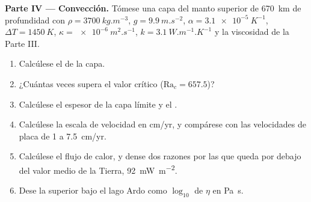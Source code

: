 \begin{problem}
\medskip\noindent\textbf{Parte IV --- Convección.} Tómese una capa del manto superior
de \qty{670}{km} de profundidad con $\rho = \qty{3700}{kg.m^{-3}}$, $g =
\qty{9.9}{m.s^{-2}}$, $\alpha = \qty{3.1e-5}{K^{-1}}$, $\Delta T =
\qty{1450}{K}$, $\kappa = \qty{e-6}{m^2.s^{-1}}$, $k = \qty{3.1}{W.m^{-1}.K^{-1}}$
y la viscosidad de la Parte III.
\begin{enumerate}[resume]
  \item Calcúlese el  de la capa.
  \item ¿Cuántas veces supera el valor crítico ($\mathrm{Ra}_c = 657.5$)?
  \item Calcúlese el espesor de la capa límite y el .
  \item Calcúlese la escala de velocidad en \unit{cm/yr}, y compárese con las velocidades de placa
        de 1 a \qty{7.5}{cm/yr}.
  \item Calcúlese el flujo de calor, y dense dos razones por las que queda por debajo del
        valor medio de la Tierra, \qty{92}{mW.m^{-2}}.
  \item Dese la  superior bajo el lago Ardo como $\log_{10}$ de
        $\eta$ en \unit{Pa.s}.
\end{enumerate}
\end{problem}
